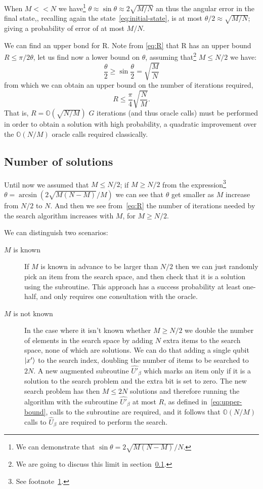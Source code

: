 When $M<<N$ we have\footnote{\label{foot:sin}We can demonstrate that $\sin\theta = 2\sqrt{M(N-M)}/N$.} $\theta \approx \sin\theta \approx 2\sqrt{M/N}$ an thus the angular error in the final state,, recalling again the state~\ref{eq:initial-state}, is at most $\theta/2 \approx \sqrt{M/N}$; giving a probability of error of at most $M/N$.

We can find an upper bond for R. Note from \ref{eq:R}  that R has an upper bound $R \leq \pi/2\theta$, let us find now a lower bound on $\theta$, assuming that\footnote{We are going to discuss this limit in section~\ref{sec:M}.} $M \leq N/2$ we have:
\begin{equation*}
    \frac{\theta}{2} \geq \sin\frac{\theta}{2} = \sqrt{\frac{M}{N}}
\end{equation*}
from which we can obtain an upper bound on the number of iterations required,
\begin{equation}\label{eq:upper-bound}
    R \leq \frac{\pi}{4} \sqrt{\frac{N}{M}}.
\end{equation}
That is, $R = \mathbb{O}(\sqrt{N/M})$ $G$ iterations (and thus oracle calls) must be performed in order to obtain a solution with high probability, a quadratic improvement over the $\mathbb{O}(N/M)$ oracle calls required classically.

\subsection{Number of solutions}\label{sec:M}
Until now we assumed that $M\leq N/2$; if $M \geq N/2$ from the expression\footnote{See footnote~\ref{foot:sin}.} $\theta=\arcsin(2\sqrt{M(N-M)}/M)$ we can see that $\theta$ get smaller as $M$ increase from $N/2$ to $N$. And then we see from~\ref{eq:R} the number of iterations needed by the search algorithm increases with $M$, for $M\geq N/2$.

We can distinguish two scenarios:
\begin{description}
   \item[$M$ is known] If $M$ is known in advance to be larger than $N/2$ then we can just randomly pick an item from the search space, and then check that it is a solution using the subroutine. This approach has a success probability at least one-half, and only requires one consultation with the oracle.
   \item[$M$ is not known] In the case where it isn't known whether $M\geq N/2$ we double the number of elements in the search space by adding $N$ extra items to the search space, none of which are solutions. We can do that adding a single qubit $\ket{x'}$ to the search index, doubling the number of items to be searched to $2N$. A new augmented subroutine $\hat{U'}_\beta$ which marks an item only if it is a solution to the search problem and the extra bit is set to zero. The new search problem has then $M \leq 2N$ solutions and therefore running the algorithm with the subroutine $\hat{U'}_\beta$ at most $R$, as defined in~\ref{eq:upper-bound}, calls to the subroutine are required, and it follows that $\mathbb{O}(N/M)$ calls to $\hat{U}_\beta$ are required to perform the search.
\end{description}
